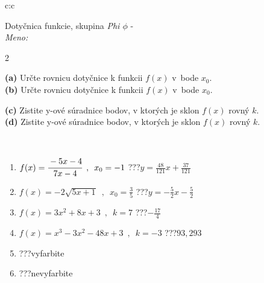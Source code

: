 \documentclass[10pt]{report}
\begin{document}
\begin{tabular}{c:c}
\begin{minipage}[c][104.5mm][t]{0.5\linewidth}
\begin{center}
\vspace{7mm}
{\huge Dotyčnica funkcie, skupina \textit{Phi $\phi$} -}\\[5mm]
\textit{Meno:}\phantom{xxxxxxxxxxxxxxxxxxxxxxxxxxxxxxxxxxxxxxxxxxxxxxxxxxxxxxxxxxxxxxxxx}\\[5mm]
\begin{minipage}{0.95\linewidth}
\begin{center}
{\small \begin{multicols}{2} \raggedright
\textbf{(a)} Určte rovnicu dotyčnice k funkcii \(f(x)\) v~bode \(x_0\). \\[1mm]
\textbf{(b)} Určte rovnicu dotyčnice k funkcii \(f(x)\) v~bode \(x_0\). \par \columnbreak
\textbf{(c)} Zistite y-ové súradnice bodov, v ktorých je sklon \(f(x)\) rovný \(k\). \\[1mm]
\textbf{(d)} Zistite y-ové súradnice bodov, v ktorých je sklon \(f(x)\) rovný \(k\). \\[1mm]
\end{multicols}
}
\end{center}
\end{minipage}
\\[4mm]
\begin{minipage}{0.79\linewidth}
\begin{center}
\begin{varwidth}{\linewidth}
\begin{enumerate}
\normalsizerr
\item $f(x)=\cfrac{-5x-4}{7x-4}\enspace , \enspace x_0=-1$\quad \dotfill\; ???\;\dotfill \quad $y = \frac{48}{121}x+\frac{37}{121}$
\item $f(x)=-2\sqrt{5x+1}\enspace , \enspace x_0=\frac{3}{5}$\quad \dotfill\; ???\;\dotfill \quad $y = -\frac{5}{2}x-\frac{5}{2}$
\item $f(x)=3x^2+8x+3\enspace , \enspace k=7$\quad \dotfill\; ???\;\dotfill \quad $-\frac{17}{4}$
\item $f(x)=x^3-3x^2-48x+3\enspace , \enspace k=-3$\quad \dotfill\; ???\;\dotfill \quad $93 , 293$
\item \quad \dotfill\; ???\;\dotfill \quad vyfarbite
\item \quad \dotfill\; ???\;\dotfill \quad nevyfarbite
\end{enumerate}
\end{varwidth}

\end{center}
\end{minipage}
\end{center}
\end{minipage}
\end{tabular}
\end{document}
